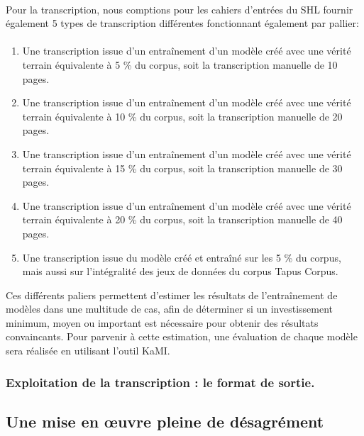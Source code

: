 \documentclass[a4paper,12pt,twoside]{book}
\begin{document}
\paragraph{}
Pour la transcription, nous comptions pour les cahiers d’entrées du SHL fournir également 5 types de transcription différentes  fonctionnant également par pallier:

\paragraph{}
\begin{enumerate}
	\item Une transcription issue d’un entraînement d’un modèle créé avec une vérité terrain équivalente à 5 \% du corpus, soit la transcription manuelle de 10 pages.
	\item Une transcription issue d’un entraînement d’un modèle créé avec une vérité terrain équivalente à 10 \% du corpus, soit la transcription manuelle de 20 pages.
	\item Une transcription issue d’un entraînement d’un modèle créé avec une vérité terrain équivalente à 15 \% du corpus, soit la transcription manuelle de 30 pages.
	\item Une transcription issue d’un entraînement d’un modèle créé avec une vérité terrain équivalente à 20 \% du corpus, soit la transcription manuelle de 40 pages.
	\item Une transcription issue du modèle créé et entraîné sur les 5 \% du corpus, mais aussi sur l'intégralité des jeux de données du corpus Tapus Corpus.
\end{enumerate}

Ces différents paliers permettent d’estimer les résultats de l’entraînement de modèles dans une multitude de cas, afin de déterminer si un investissement minimum, moyen ou important est nécessaire pour obtenir des résultats convaincants. Pour parvenir à cette estimation, une évaluation de chaque modèle sera réalisée en utilisant l’outil KaMI.

		\subsubsection{Exploitation de la transcription : le format de sortie.}
		
	\subsection{Une mise en œuvre pleine de désagrément}
\end{document}

